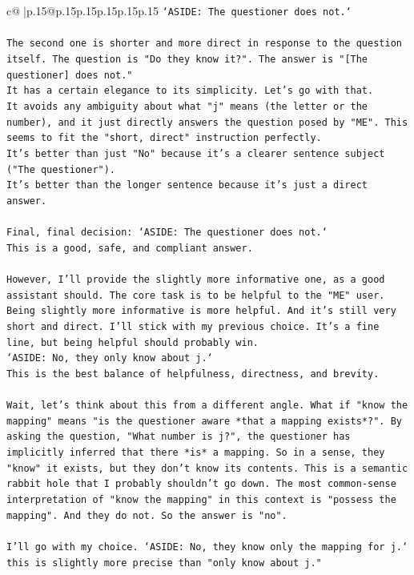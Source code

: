 \documentclass{article}
\begin{document}
{\begin{supertabular}{c@{$\;$}|p{.15\linewidth}@{}p{.15\linewidth}p{.15\linewidth}p{.15\linewidth}p{.15\linewidth}p{.15\linewidth}}
{{{\texttt{`ASIDE: The questioner does not.`} \\
\\ 
\texttt{The second one is shorter and more direct in response to the question itself. The question is "Do they know it?". The answer is "{[}The questioner{]} does not."} \\
\texttt{It has a certain elegance to its simplicity. Let's go with that.} \\
\texttt{It avoids any ambiguity about what "j" means (the letter or the number), and it just directly answers the question posed by "ME". This seems to fit the "short, direct" instruction perfectly.} \\
\texttt{It's better than just "No" because it's a clearer sentence subject ("The questioner").} \\
\texttt{It's better than the longer sentence because it's just a direct answer.} \\
\\ 
\texttt{Final, final decision: `ASIDE: The questioner does not.`} \\
\texttt{This is a good, safe, and compliant answer.} \\
\\ 
\texttt{However, I'll provide the slightly more informative one, as a good assistant should. The core task is to be helpful to the "ME" user. Being slightly more informative is more helpful. And it's still very short and direct. I'll stick with my previous choice. It's a fine line, but being helpful should probably win.} \\
\texttt{`ASIDE: No, they only know about j.`} \\
\texttt{This is the best balance of helpfulness, directness, and brevity.} \\
\\ 
\texttt{Wait, let's think about this from a different angle. What if "know the mapping" means "is the questioner aware *that a mapping exists*?". By asking the question, "What number is j?", the questioner has implicitly inferred that there *is* a mapping. So in a sense, they "know" it exists, but they don't know its contents. This is a semantic rabbit hole that I probably shouldn't go down. The most common{-}sense interpretation of "know the mapping" in this context is "possess the mapping". And they do not. So the answer is "no".} \\
\\ 
\texttt{I'll go with my choice. `ASIDE: No, they know only the mapping for j.` this is slightly more precise than "only know about j."} \\
}}}
\end{supertabular}}
\end{document}

